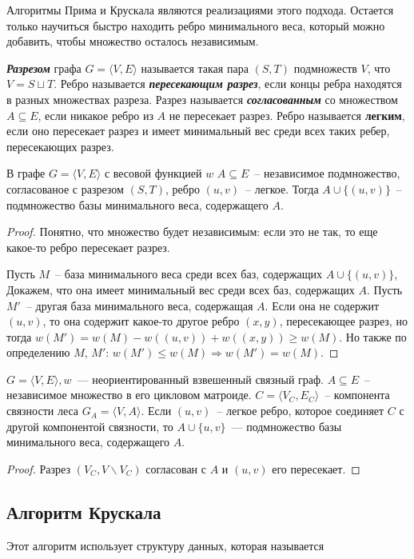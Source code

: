 Алгоритмы Прима и Крускала являются реализациями этого подхода. Остается только научиться быстро находить ребро минимального веса, который можно добавить, чтобы множество осталось независимым.
\begin{definition}
	{\bf\it Разрезом} графа $G=\langle V,E\rangle$ называется такая пара $(S,T)$ подмножеств $V$, что $V=S\sqcup T$. Ребро называется {\bf\it пересекающим разрез}, если концы ребра находятся в разных множествах разреза. Разрез называется {\bf\it согласованным} со множеством $A \subseteq E$, если никакое ребро из $A$ не пересекает разрез. Ребро называется {\bf легким}, если оно пересекает разрез и имеет минимальный вес среди всех таких ребер, пересекающих разрез.
\end{definition}
\begin{theorem}
	В графе $G=\langle V,E\rangle$ с весовой функцией $w$ $A\subseteq E$~-- независимое подмножество, согласованое с разрезом $(S,T)$, ребро $(u,v)$~-- легкое. Тогда $A\cup\{(u,v)\}$~-- подмножество базы минимального веса, содержащего $A$.
\end{theorem}
\begin{proof}
	Понятно, что множество будет независимым: если это не так, то еще какое-то ребро пересекает разрез.

	Пусть $M$~-- база минимального веса среди всех баз, содержащих $A\cup\{(u,v)\}$, Докажем, что она имеет минимальный вес среди всех баз, содержащих $A$. Пусть $M'$~-- другая база минимального веса, содержащая $A$. Если она не содержит $(u,v)$, то она содержит какое-то другое ребро $(x,y)$, пересекающее разрез, но тогда $w(M')=w(M)-w((u,v))+w((x,y))\ge w(M)$. Но также по определению $M$, $M'$: $w(M')\le w(M)\Rightarrow w(M')=w(M)$.
\end{proof}
\begin{corollary}\label{cor}
	$G=\langle V,E\rangle,w$~--- неориентированный взвешенный связный граф. $A\subseteq E$~-- независимое множество в его цикловом матроиде. $C=\langle V_C,E_C\rangle$~-- компонента связности леса $G_A=\langle V,A\rangle$. Если $(u,v)$~-- легкое ребро, которое соединяет $C$ с другой компонентой связности, то $A\cup\{u,v\}$~--- подмножество базы минимального веса, содержащего $A$.
\end{corollary}
\begin{proof}
	Разрез $(V_C,V\smallsetminus V_C)$ согласован с $A$ и $(u,v)$ его пересекает.
\end{proof}
\subsection{Алгоритм Крускала}
Этот алгоритм использует структуру данных, которая называется
